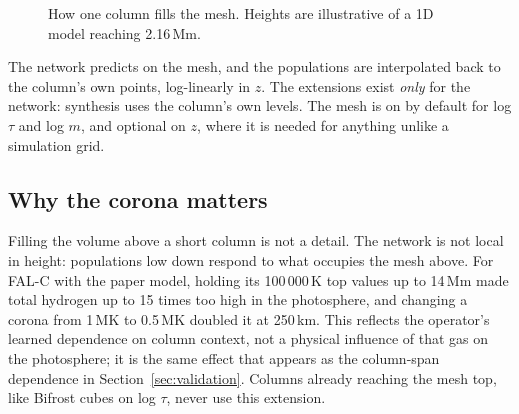 \begin{figure}[H]\centering
{}
\caption{How one column fills the mesh. Heights are illustrative of a 1D model reaching 2.16\,Mm.}
\end{figure}

The network predicts on the mesh, and the populations are interpolated back to the column's own points, log-linearly in $z$. The extensions exist \emph{only} for the network: synthesis uses the column's own levels. The mesh is on by default for log $\tau$ and log $m$, and optional on $z$, where it is needed for anything unlike a simulation grid.

\subsection{Why the corona matters}
Filling the volume above a short column is not a detail. The network is not local in height: populations low down respond to what occupies the mesh above. For FAL-C with the paper model, holding its 100\,000\,K top values up to 14\,Mm made total hydrogen up to 15 times too high in the photosphere, and changing a corona from 1\,MK to 0.5\,MK doubled it at 250\,km. This reflects the operator's learned dependence on column context, not a physical influence of that gas on the photosphere; it is the same effect that appears as the column-span dependence in Section~\ref{sec:validation}. Columns already reaching the mesh top, like Bifrost cubes on log $\tau$, never use this extension.

